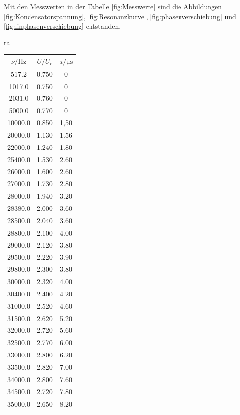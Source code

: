 Mit den Messwerten in der Tabelle \ref{fig:Messwerte} sind die  Abbildungen
\ref{fig:Kondensatorspannung}, \ref{fig:Resonanzkurve},
\ref{fig:phasenverschiebung} und \ref{fig:linphasenverschiebung}
entstanden.
\begin{table}ra
  \centering
  \begin{tabular}{c c c}
    \toprule
    $\nu/\si{\hertz}$ & $U/U_c$ & $a/\si{\micro\second}$ \\
    \midrule
         517.2  &  0.750  &  0     \\
        1017.0  &  0.750  &  0     \\
        2031.0  &  0.760  &  0     \\
        5000.0  &  0.770  &  0     \\
       10000.0  &  0.850  &  1,50  \\
       20000.0  &  1.130  &  1.56  \\
       22000.0  &  1.240  &  1.80  \\
       25400.0  &  1.530  &  2.60  \\
       26000.0  &  1.600  &  2.60  \\
       27000.0  &  1.730  &  2.80  \\
       28000.0  &  1.940  &  3.20  \\
       28380.0  &  2.000  &  3.60  \\
       28500.0  &  2.040  &  3.60  \\
       28800.0  &  2.100  &  4.00  \\
       29000.0  &  2.120  &  3.80  \\
       29500.0  &  2.220  &  3.90  \\
       29800.0  &  2.300  &  3.80  \\
       30000.0  &  2.320  &  4.00  \\
       30400.0  &  2.400  &  4.20  \\
       31000.0  &  2.520  &  4.60  \\
       31500.0  &  2.620  &  5.20  \\
       32000.0  &  2.720  &  5.60  \\
       32500.0  &  2.770  &  6.00  \\
       33000.0  &  2.800  &  6.20  \\
       33500.0  &  2.820  &  7.00  \\
       34000.0  &  2.800  &  7.60  \\
       34500.0  &  2.720  &  7.80  \\
       35000.0  &  2.650  &  8.20  \\

\end{tabular}
\end{table}
